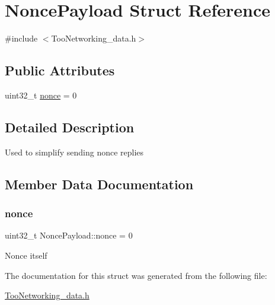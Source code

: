 \hypertarget{structNoncePayload}{}\section{Nonce\+Payload Struct Reference}
\label{structNoncePayload}


{\ttfamily \#include $<$Too\+Networking\+\_\+data.\+h$>$}

\subsection*{Public Attributes}
\begin{DoxyCompactItemize}
\item 
uint32\+\_\+t \hyperlink{structNoncePayload_ac738ccf9734f52407eef0b48bdf6cb01}{nonce} = 0
\end{DoxyCompactItemize}


\subsection{Detailed Description}
Used to simplify sending nonce replies 

\subsection{Member Data Documentation}
\mbox{\label{structNoncePayload_ac738ccf9734f52407eef0b48bdf6cb01}} 
\subsubsection{\texorpdfstring{nonce}{nonce}}
{\footnotesize\ttfamily uint32\+\_\+t Nonce\+Payload\+::nonce = 0}

Nonce itself 

The documentation for this struct was generated from the following file\+:\begin{DoxyCompactItemize}
\item 
\hyperlink{TooNetworking__data_8h}{Too\+Networking\+\_\+data.\+h}\end{DoxyCompactItemize}
